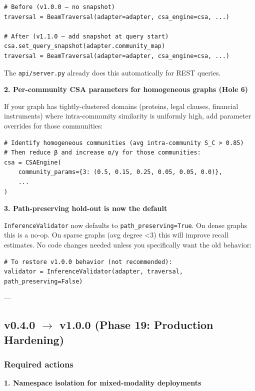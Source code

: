 \documentclass[11pt,article,oneside]{memoir}
\begin{document}
\begin{lstlisting}
# Before (v1.0.0 — no snapshot)
traversal = BeamTraversal(adapter=adapter, csa_engine=csa, ...)

# After (v1.1.0 — add snapshot at query start)
csa.set_query_snapshot(adapter.community_map)
traversal = BeamTraversal(adapter=adapter, csa_engine=csa, ...)
\end{lstlisting}

The \texttt{api/server.py} already does this autom\-atically for REST queries.

\textbf{2. Per-community CSA parameters for homogeneous graphs (Hole 6)}

If your graph has tightly-clustered domains (proteins, legal clauses, financial instruments) where intra-community similarity is uniformly high, add parameter overrides for those communities:

\begin{lstlisting}
# Identify homogeneous communities (avg intra-community S_C > 0.85)
# Then reduce β and increase α/γ for those communities:
csa = CSAEngine(
    community_params={3: (0.5, 0.15, 0.25, 0.05, 0.05, 0.0)},
    ...
)
\end{lstlisting}

\textbf{3. Path-preserving hold-out is now the default}

\texttt{InferenceValidator} now defaults to \texttt{path\_preserving=True}. On dense graphs this is a no-op. On sparse graphs (avg degree \textless  3) this will improve recall estimates. No code changes needed unless you speci\-fically want the old behavior:

\begin{lstlisting}
# To restore v1.0.0 behavior (not recommended):
validator = InferenceValidator(adapter, traversal, path_preserving=False)
\end{lstlisting}

---

\subsection{v0.4.0 $\to$ v1.0.0 (Phase 19: Production Hardening)}

\subsubsection{Required actions}

\textbf{1. Namespace isolation for mixed-modality deployments}
\end{document}
